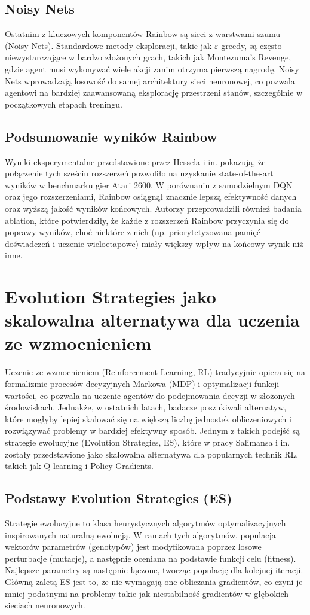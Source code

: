 \subsection{Noisy Nets}
Ostatnim z kluczowych komponentów Rainbow są sieci z warstwami szumu (Noisy Nets). Standardowe metody eksploracji, takie jak $\varepsilon$-greedy, są często niewystarczające w bardzo złożonych grach, takich jak Montezuma’s Revenge, gdzie agent musi wykonywać wiele akcji zanim otrzyma pierwszą nagrodę. Noisy Nets wprowadzają losowość do samej architektury sieci neuronowej, co pozwala agentowi na bardziej zaawansowaną eksplorację przestrzeni stanów, szczególnie w początkowych etapach treningu.

\subsection{Podsumowanie wyników Rainbow}
Wyniki eksperymentalne przedstawione przez Hessela i in. \cite{RAI} pokazują, że połączenie tych sześciu rozszerzeń pozwoliło na uzyskanie state-of-the-art wyników w benchmarku gier Atari 2600. W porównaniu z samodzielnym DQN oraz jego rozszerzeniami, Rainbow osiągnął znacznie lepszą efektywność danych oraz wyższą jakość wyników końcowych. Autorzy przeprowadzili również badania ablation, które potwierdziły, że każde z rozszerzeń Rainbow przyczynia się do poprawy wyników, choć niektóre z nich (np. priorytetyzowana pamięć doświadczeń i uczenie wieloetapowe) miały większy wpływ na końcowy wynik niż inne.

\section{Evolution Strategies jako skalowalna alternatywa dla uczenia ze wzmocnieniem}

Uczenie ze wzmocnieniem (Reinforcement Learning, RL) tradycyjnie opiera się na formalizmie procesów decyzyjnych Markowa (MDP) i optymalizacji funkcji wartości, co pozwala na uczenie agentów do podejmowania decyzji w złożonych środowiskach. Jednakże, w ostatnich latach, badacze poszukiwali alternatyw, które mogłyby lepiej skalować się na większą liczbę jednostek obliczeniowych i rozwiązywać problemy w bardziej efektywny sposób. Jednym z takich podejść są strategie ewolucyjne (Evolution Strategies, ES), które w pracy Salimansa i in. \cite{EV} zostały przedstawione jako skalowalna alternatywa dla popularnych technik RL, takich jak Q-learning i Policy Gradients.
\subsection{Podstawy Evolution Strategies (ES)}
Strategie ewolucyjne to klasa heurystycznych algorytmów optymalizacyjnych inspirowanych naturalną ewolucją. W ramach tych algorytmów, populacja wektorów parametrów (genotypów) jest modyfikowana poprzez losowe perturbacje (mutacje), a następnie oceniana na podstawie funkcji celu (fitness). Najlepsze parametry są następnie łączone, tworząc populację dla kolejnej iteracji. Główną zaletą ES jest to, że nie wymagają one obliczania gradientów, co czyni je mniej podatnymi na problemy takie jak niestabilność gradientów w głębokich sieciach neuronowych.

